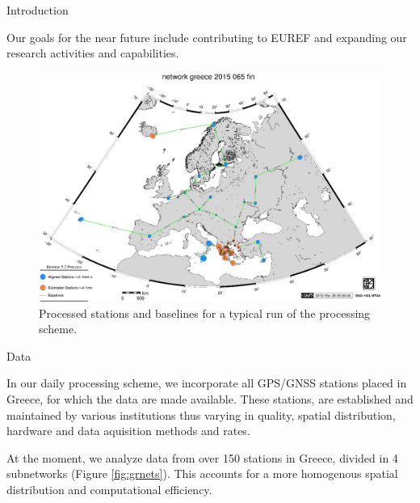 \documentclass[final,a0,portrait]{beamer}
\newlength{\onecolwid}
\begin{document}
\begin{frame}[t]
\begin{columns}[t]
\begin{column}{\onecolwid}
\begin{block}{Introduction}
{Our goals for the near future include contributing to EUREF and expanding our research activities and capabilities.

}
\end{block}


\begin{figure}
    \includegraphics[width=0.7\onecolwid]{eu-greece-15065-fin-proc.eps}
    \caption{Processed stations and baselines for a typical run of the processing scheme.}
    \label{fig:proc-net}
\end{figure}
\begin{block}{Data}
{\small
In our daily processing scheme, we incorporate all GPS/GNSS stations placed in Greece, for which the data are made available. 
These stations, are established and maintained by various institutions thus varying in quality, spatial distribution, hardware and 
data aquisition methods and rates.

At the moment, we analyze data from over 150 stations in Greece, divided in 4 subnetworks (Figure \ref{fig:grnets}). 
This accounts for a more homogenous spatial distribution and computational efficiency.


}
\end{block}
\end{column}
\end{columns}
\end{frame}
\end{document}
